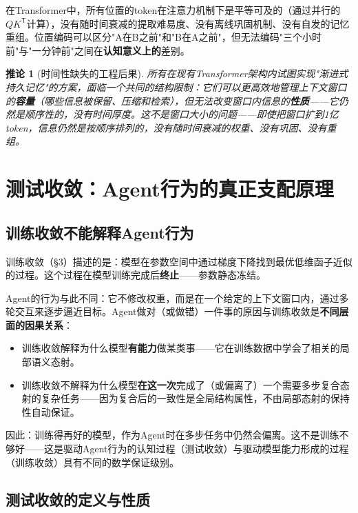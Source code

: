 \documentclass[11pt,a4paper]{ctexart}
\newtheorem{corollary}[theorem]{推论}
\begin{document}
在Transformer中，所有位置的token在注意力机制下是平等可及的（通过并行的$QK^{\mathsf{T}}$计算），没有随时间衰减的提取难易度、没有离线巩固机制、没有自发的记忆重组。位置编码可以区分"A在B之前"和"B在A之前"，但无法编码"三个小时前"与"一分钟前"之间在\textbf{认知意义上的}差别。

\begin{corollary}[时间性缺失的工程后果]
    所有在现有Transformer架构内试图实现"渐进式持久记忆"的方案，面临一个共同的结构限制：它们可以更高效地管理上下文窗口的\textbf{容量}（哪些信息被保留、压缩和检索），但无法改变窗口内信息的\textbf{性质}——它仍然是顺序性的，没有时间厚度。这不是窗口大小的问题——即使把窗口扩到1亿token，信息仍然是按顺序排列的，没有随时间衰减的权重、没有巩固、没有重组。
\end{corollary}


\section{测试收敛：Agent行为的真正支配原理}

\subsection{训练收敛不能解释Agent行为}

训练收敛（§3）描述的是：模型在参数空间中通过梯度下降找到最优低维函子近似的过程。这个过程在模型训练完成后\textbf{终止}——参数静态冻结。

Agent的行为与此不同：它不修改权重，而是在一个给定的上下文窗口内，通过多轮交互来逐步逼近目标。Agent做对（或做错）一件事的原因与训练收敛是\textbf{不同层面的因果关系}：

\begin{itemize}[leftmargin=*]
    \item 训练收敛解释为什么模型\textbf{有能力}做某类事——它在训练数据中学会了相关的局部语义态射。
    \item 训练收敛不解释为什么模型\textbf{在这一次}完成了（或偏离了）一个需要多步复合态射的复杂任务——因为复合后的一致性是全局结构属性，不由局部态射的保持性自动保证。
\end{itemize}

因此：训练得再好的模型，作为Agent时在多步任务中仍然会偏离。这不是训练不够好——这是驱动Agent行为的认知过程（测试收敛）与驱动模型能力形成的过程（训练收敛）具有不同的数学保证级别。

\subsection{测试收敛的定义与性质}
\end{document}
